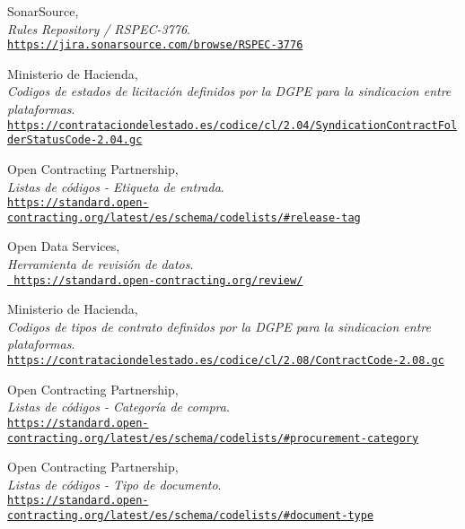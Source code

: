 \begin{thebibliography}{X}
            SonarSource,
            \\ \textit{Rules Repository / RSPEC-3776}.
            \\ \texttt{\url{https://jira.sonarsource.com/browse/RSPEC-3776}}
        
            Ministerio de Hacienda,
            \\ \textit{Codigos de estados de licitación definidos por la DGPE para la sindicacion entre plataformas}.
            \\ \texttt{\url{https://contrataciondelestado.es/codice/cl/2.04/SyndicationContractFolderStatusCode-2.04.gc}}
            
            Open Contracting Partnership,
            \\ \textit{Listas de códigos - Etiqueta de entrada}.
            \\ \texttt{\url{https://standard.open-contracting.org/latest/es/schema/codelists/\#release-tag}}
            
            Open Data Services,
            \\ \textit{Herramienta de revisión de datos}.
            \\ \texttt{\url{ https://standard.open-contracting.org/review/}}
            
            Ministerio de Hacienda,
            \\ \textit{Codigos de tipos de contrato definidos por la DGPE para la sindicacion entre plataformas}.
            \\ \texttt{\url{https://contrataciondelestado.es/codice/cl/2.08/ContractCode-2.08.gc}}
            
            Open Contracting Partnership,
            \\ \textit{Listas de códigos - Categoría de compra}.
            \\ \texttt{\url{https://standard.open-contracting.org/latest/es/schema/codelists/\#procurement-category}}
            
            Open Contracting Partnership,
            \\ \textit{Listas de códigos - Tipo de documento}.
            \\ \texttt{\url{https://standard.open-contracting.org/latest/es/schema/codelists/\#document-type}}
            

\end{thebibliography}

